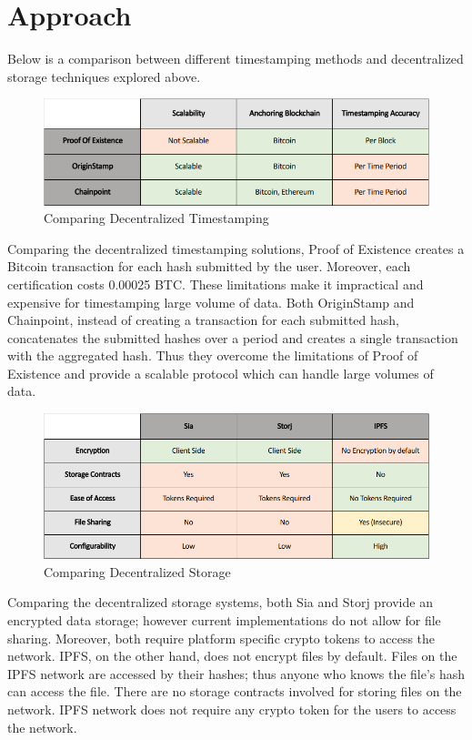 \documentclass[]{report}
\begin{document}
	\section*{Approach}
		Below is a comparison between different timestamping methods and decentralized storage techniques explored above.
		
		\begin{figure}[h]
			\includegraphics[width=\linewidth]{comparison-timestamping.png}
			\caption{Comparing Decentralized Timestamping}
			\label{fig:comparison-timestamping}
		\end{figure}
	
		Comparing the decentralized timestamping solutions, Proof of Existence creates a Bitcoin transaction for each hash submitted by the user. Moreover, each certification costs 0.00025 BTC. These limitations make it impractical and expensive for timestamping large volume of data. Both OriginStamp and Chainpoint, instead of creating a transaction for each submitted hash, concatenates the submitted hashes over a period and creates a single transaction with the aggregated hash. Thus they overcome the limitations of Proof of Existence and provide a scalable protocol which can handle large volumes of data.
	
		\begin{figure}[h]
			\includegraphics[width=\linewidth]{comparison-storage.png}
			\caption{Comparing Decentralized Storage}
			\label{fig:comparison-storage}
		\end{figure}
	
		Comparing the decentralized storage systems, both Sia and Storj provide an encrypted data storage; however current implementations do not allow for file sharing. Moreover, both require platform specific crypto tokens to access the network. IPFS, on the other hand, does not encrypt files by default. Files on the IPFS network are accessed by their hashes; thus anyone who knows the file’s hash can access the file. There are no storage contracts involved for storing files on the network. IPFS network does not require any crypto token for the users to access the network.
		
\end{document}
